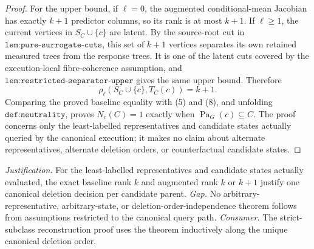 \documentclass{article}
\begin{document}
\begin{proof}
For the upper bound, if \(\ell=0\), the augmented conditional-mean Jacobian has exactly \(k+1\) predictor columns, so its rank is at most \(k+1\).  If \(\ell\geq1\), the current vertices in \(S_C\cup\{c\}\) are latent.  By the source-root cut in \(\texttt{lem:pure-surrogate-cuts}\), this set of \(k+1\) vertices separates its own retained measured trees from the response trees.  It is one of the latent cuts covered by the execution-local fibre-coherence assumption, and \(\texttt{lem:restricted-separator-upper}\) gives the same upper bound.  Therefore
\[
 \rho_\ell(S_C\cup\{c\},T_C(c))=k+1. \tag{8}
\]
Comparing the proved baseline equality with (5) and (8), and unfolding \(\texttt{def:neutrality}\), proves \(N_c(C)=1\) exactly when \(\operatorname{Pa}_G(c)\subseteq C\).  The proof concerns only the least-labelled representatives and candidate states actually queried by the canonical execution; it makes no claim about alternate representatives, alternate deletion orders, or counterfactual candidate states.
\end{proof}
\par\smallskip\noindent \textit{Justification.} For the least-labelled representatives and candidate states actually evaluated, the exact baseline rank \(k\) and augmented rank \(k\) or \(k+1\) justify one canonical deletion decision per candidate parent. \textit{Gap.} No arbitrary-representative, arbitrary-state, or deletion-order-independence theorem follows from assumptions restricted to the canonical query path. \textit{Consumer.} The strict-subclass reconstruction proof uses the theorem inductively along the unique canonical deletion order.
\end{document}
